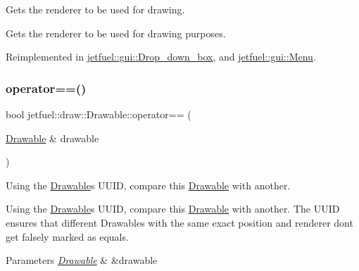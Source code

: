 Gets the renderer to be used for drawing. 

Gets the renderer to be used for drawing purposes. 

Reimplemented in \hyperlink{classjetfuel_1_1gui_1_1Drop__down__box_ab8beac8ed8b442d96723f72a2fe9edb6}{jetfuel\+::gui\+::\+Drop\+\_\+down\+\_\+box}, and \hyperlink{classjetfuel_1_1gui_1_1Menu_a411940386454af4e44dc8c0c84c00215}{jetfuel\+::gui\+::\+Menu}.

\mbox{\label{classjetfuel_1_1draw_1_1Drawable_a3b8d50394e8411a8009f50da826b3ac2}} 
\subsubsection{\texorpdfstring{operator==()}{operator==()}}
{\footnotesize\ttfamily bool jetfuel\+::draw\+::\+Drawable\+::operator== (\begin{DoxyParamCaption}\item[{\hyperlink{classjetfuel_1_1draw_1_1Drawable}{Drawable} \&}]{drawable }\end{DoxyParamCaption})\hspace{0.3cm}{\ttfamily [inline]}}



Using the \hyperlink{classjetfuel_1_1draw_1_1Drawable}{Drawable}\textquotesingle{}s U\+U\+ID, compare this \hyperlink{classjetfuel_1_1draw_1_1Drawable}{Drawable} with another. 

Using the \hyperlink{classjetfuel_1_1draw_1_1Drawable}{Drawable}\textquotesingle{}s U\+U\+ID, compare this \hyperlink{classjetfuel_1_1draw_1_1Drawable}{Drawable} with another. The U\+U\+ID ensures that different Drawables with the same exact position and renderer don\textquotesingle{}t get falsely marked as equals.


\begin{DoxyParams}{Parameters}
{\em \hyperlink{classjetfuel_1_1draw_1_1Drawable}{Drawable}} & \&drawable \\
\hline
\end{DoxyParams}
\mbox{\label{classjetfuel_1_1draw_1_1Drawable_af8ff41fd1f3e2787743f916386ea225c}} 
